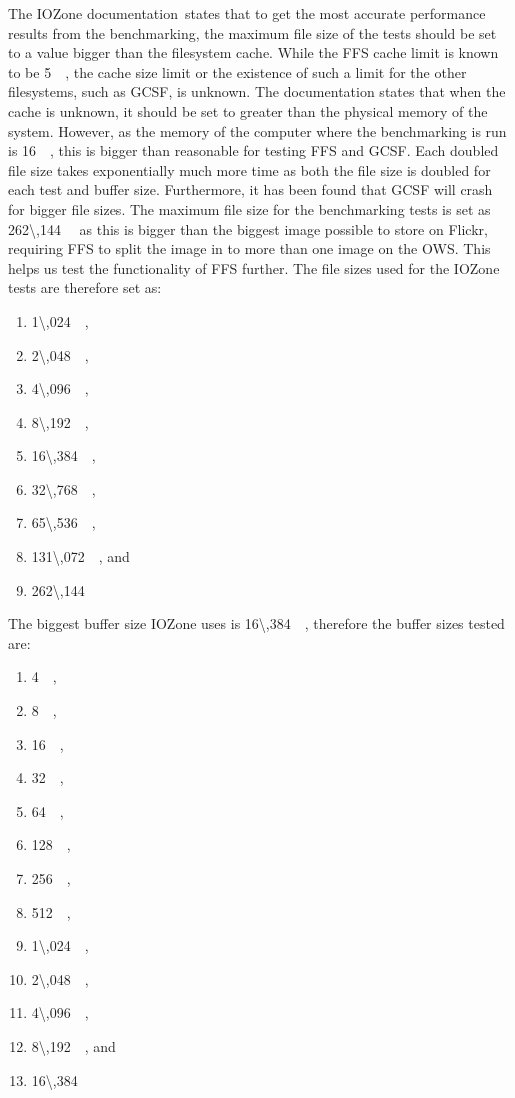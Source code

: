 The IOZone documentation\,\cite{iozoneIozoneFilesystemBenchmark} states that to get the most accurate performance results from the benchmarking, the maximum file size of the tests should be set to a value bigger than the filesystem cache. While the \gls{FFS} cache limit is known to be \SI{5}{\mega\byte}, the cache size limit or the existence of such a limit for the other filesystems, such as \gls{GCSF}, is unknown. The documentation states that when the cache is unknown, it should be set to greater than the physical memory of the system. However, as the memory of the computer where the benchmarking is run is \SI{16}{\giga\byte}, this is bigger than reasonable for testing \gls{FFS} and \gls{GCSF}. Each doubled file size takes exponentially much more time as both the file size is doubled for each test and buffer size. Furthermore, it has been found that \gls{GCSF} will crash for bigger file sizes. The maximum file size for the benchmarking tests is set as \SI{262\,144}{\kilo\byte} as this is bigger than the biggest image possible to store on Flickr, requiring \gls{FFS} to split the image in to more than one image on the \gls{OWS}. This helps us test the functionality of FFS further. The file sizes used for the IOZone tests are therefore set as:
\begin{enumerate}
	\item \SI{1\,024}{\kilo\byte},
	\item \SI{2\,048}{\kilo\byte},
	\item \SI{4\,096}{\kilo\byte},
	\item \SI{8\,192}{\kilo\byte},
	\item \SI{16\,384}{\kilo\byte},
	\item \SI{32\,768}{\kilo\byte},
	\item \SI{65\,536}{\kilo\byte},
	\item \SI{131\,072}{\kilo\byte}, and
	\item \SI{262\,144}{\kilo\byte}
\end{enumerate}
The biggest buffer size IOZone uses is \SI{16\,384}{\kilo\byte}, therefore the buffer sizes tested are:
\begin{enumerate}
	\item \SI{4}{\kilo\byte},
	\item \SI{8}{\kilo\byte},
	\item \SI{16}{\kilo\byte},
	\item \SI{32}{\kilo\byte},
	\item \SI{64}{\kilo\byte},
	\item \SI{128}{\kilo\byte},
	\item \SI{256}{\kilo\byte},
	\item \SI{512}{\kilo\byte},
	\item \SI{1\,024}{\kilo\byte},
	\item \SI{2\,048}{\kilo\byte},
	\item \SI{4\,096}{\kilo\byte},
	\item \SI{8\,192}{\kilo\byte}, and
	\item \SI{16\,384}{\kilo\byte}
\end{enumerate}
